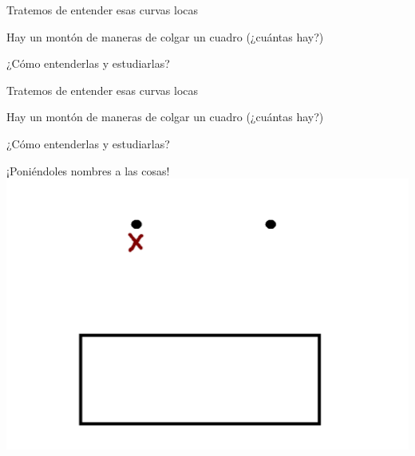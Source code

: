 \documentclass[11pt]{beamer}
\begin{document}
\begin{frame}{Tratemos de entender esas curvas locas}

	Hay un montón de maneras de colgar un cuadro (¿cuántas hay?)
	
	¿Cómo entenderlas y estudiarlas?
%	
%	


\end{frame}

\begin{frame}{Tratemos de entender esas curvas locas}

	Hay un montón de maneras de colgar un cuadro (¿cuántas hay?)
	
	¿Cómo entenderlas y estudiarlas?


	\Large{¡Poniéndoles nombres a las cosas!}
	\includegraphics[scale=0.35]{images/_x.png}

\end{frame}
\end{document}
